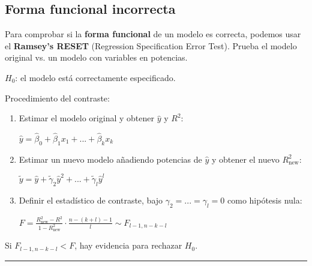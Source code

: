 \documentclass[10pt, a4paper, landscape]{extarticle}
\begin{document}
\begin{multicols}{3}
\section*{Forma funcional incorrecta}
	Para comprobar si la \textbf{forma funcional} de un modelo es correcta, podemos usar el \textbf{Ramsey's RESET} (Regression Specification Error Test). Prueba el modelo original vs. un modelo con variables en potencias.
	\begin{center}
		$H_0$: el modelo está correctamente especificado.
	\end{center}
	Procedimiento del contraste:
	\begin{enumerate}[leftmargin=*]
		\item Estimar el modelo original y obtener $\hat{y}$ y $R^2$:
		\begin{center}
			$\hat{y} = \hat{\beta}_0 + \hat{\beta}_1 x_1 + ... + \hat{\beta}_k x_k$
		\end{center}
		\item Estimar un nuevo modelo añadiendo potencias de $\hat{y}$ y obtener el nuevo $R^2_{\mathrm{new}}$:
		\begin{center}
			$\tilde{y} = \hat{y} + \tilde{\gamma}_2 \hat{y}^2 + ... + \tilde{\gamma}_l \hat{y}^l$
		\end{center}
		\item Definir el estadístico de contraste, bajo $\gamma_2 = ... = \gamma_l = 0$ como hipótesis nula:
		\begin{center}
			$F = \frac{R^2_{\mathrm{new}} - R^2}{1 - R^2_{\mathrm{new}}} \cdot \frac{n -(k + l) - 1}{l} \sim F_{l-1, n-k-l}$
		\end{center}
	\end{enumerate}
	Si $F_{l-1, n-k-l} < F$, hay evidencia para rechazar $H_0$.
\end{multicols}

\noindent\rule{\textwidth}{0.4pt} %
\end{document}
